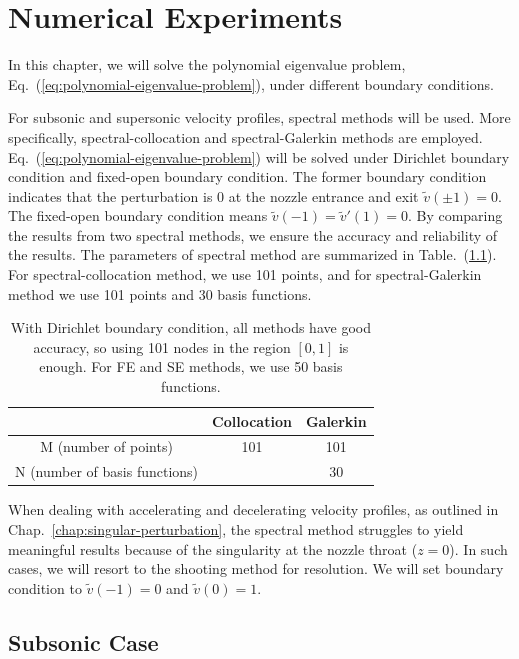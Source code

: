 \chapter{Numerical Experiments} \label{chap:numerical-experiments}
In this chapter, we will solve the polynomial eigenvalue problem, Eq.~(\ref{eq:polynomial-eigenvalue-problem}), under different boundary conditions.

For subsonic and supersonic velocity profiles, spectral methods will be used. More specifically, spectral-collocation and spectral-Galerkin methods are employed. Eq.~(\ref{eq:polynomial-eigenvalue-problem}) will be solved under Dirichlet boundary condition and fixed-open boundary condition. The former boundary condition indicates that the perturbation is 0 at the nozzle entrance and exit $\tilde{v}(\pm 1)=0$. The fixed-open boundary condition means $\tilde{v}(-1)=\tilde{v}'(1) = 0$. By comparing the results from two spectral methods, we ensure the accuracy and reliability of the results. The parameters of spectral method are summarized in Table.~(\ref{table:parameters}). For spectral-collocation method, we use 101 points, and for spectral-Galerkin method we use 101 points and 30 basis functions.

\begin{table} [htbp]
	\centering
	\caption{With Dirichlet boundary condition, all methods have good accuracy, so using 101 nodes in the region $[0,1]$ is enough. For FE and SE methods, we use 50 basis functions.}
	\begin{tabular}{|c|c|c|}
		\hline
		                              & Collocation & Galerkin \\
		\hline
		M (number of points)          & 101         & 101      \\
		\hline
		N (number of basis functions) &             & 30       \\
		\hline
	\end{tabular}
	\label{table:parameters}
\end{table}

When dealing with accelerating and decelerating velocity profiles, as outlined in Chap.~\ref{chap:singular-perturbation}, the spectral method struggles to yield meaningful results because of the singularity at the nozzle throat ($z=0$). In such cases, we will resort to the shooting method for resolution. We will set boundary condition to $\tilde{v}(-1) = 0$ and $\tilde{v}(0)=1$.

\section{Subsonic Case}
